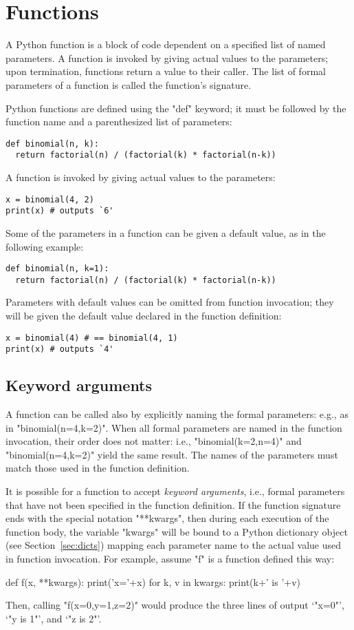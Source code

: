 {\section{Functions}
\label{sec:functions}

A Python function is a block of code dependent on a specified list of
named parameters.  A function is invoked by giving actual values to
the parameters; upon termination, functions return a value to their
caller.  The list of formal parameters of a function is called the
function's signature.

Python functions are defined using the "def" keyword; it must be
followed by the function name and a parenthesized list of parameters:
\begin{lstlisting}
def binomial(n, k):
  return factorial(n) / (factorial(k) * factorial(n-k))
\end{lstlisting}
A function is invoked by giving actual values to the parameters:
\begin{lstlisting}
x = binomial(4, 2)
print(x) # outputs `6'
\end{lstlisting}

Some of the parameters in a function can be given a default value, as
in the following example:
\begin{lstlisting}
def binomial(n, k=1):
  return factorial(n) / (factorial(k) * factorial(n-k))
\end{lstlisting}
Parameters with default values can be omitted from function
invocation; they will be given the default value declared in the
function definition:
\begin{lstlisting}
x = binomial(4) # == binomial(4, 1)
print(x) # outputs `4'
\end{lstlisting}

\subsection{Keyword arguments}
\label{sec:kwargs}

A function can be called also by explicitly naming the formal
parameters: e.g., as in "binomial(n=4,k=2)".  When all formal
parameters are named in the function invocation, their order does not
matter: i.e., "binomial(k=2,n=4)" and "binomial(n=4,k=2)" yield the
same result.  The names of the parameters must match those used in the
function definition.

It is possible for a function to accept \emph{keyword arguments},
i.e., formal parameters that have not been specified in the function
definition.  If the function signature ends with the special notation
"**kwargs", then during each execution of the function body, the
variable "kwargs" will be bound to a Python dictionary object (see
Section~\ref{sec:dicts}) mapping each parameter name to the actual value
used in function invocation.  For example, assume "f" is a function
defined this way:
\begin{codexmp}
  def f(x, **kwargs):
    print('x='+x)
    for k, v in kwargs:
      print(k+' is '+v)
\end{codexmp}
Then, calling "f(x=0,y=1,z=2)" would produce the three lines of
output `"x=0"', `"y is 1"', and `"z is 2"'.

}
